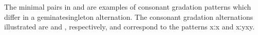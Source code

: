 The minimal pairs in  and  are examples of consonant gradation patterns which differ in a geminate\Div singleton alternation. The consonant gradation alternations illustrated are \mbox{} and \mbox{}, respectively, and correspond to the patterns \mbox{xː\Div x} and \mbox{xːy\Div xy}. %
\ea\label{CgradEx1a}%
\z
\ea\label{CgradEx1b}%
\z

